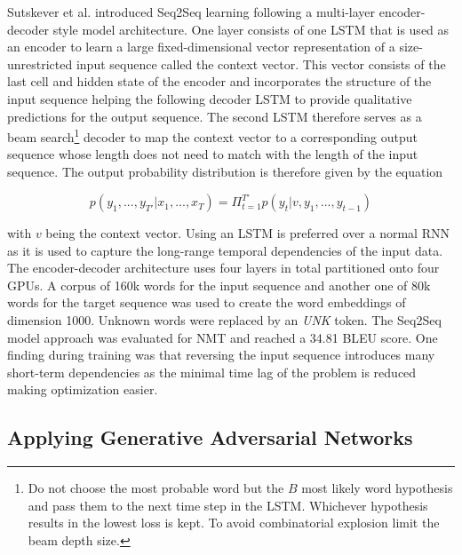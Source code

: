 Sutskever et al. \cite{Sutskever2014} introduced \ac{Seq2Seq} learning following a multi-layer encoder-decoder style model architecture. One layer consists of one \ac{LSTM} that is used as an encoder to learn a large fixed-dimensional vector representation of a size-unrestricted input sequence called the context vector. This vector consists of the last cell and hidden state of the encoder and incorporates the structure of the input sequence helping the following decoder \ac{LSTM} to provide qualitative predictions for the output sequence. The second \ac{LSTM} therefore serves as a beam search\footnote{Do not choose the most probable word but the $B$ most likely word hypothesis and pass them to the next time step in the \ac{LSTM}. Whichever hypothesis results in the lowest loss is kept. To avoid combinatorial explosion limit the beam depth size.} decoder to map the context vector to a corresponding output sequence whose length does not need to match with the length of the input sequence. The output probability distribution is therefore given by the equation

\begin{equation}
	p(y_1, ..., y_{T'} | x_1, ..., x_{T}) = \Pi_{t=1}^{T'} p(y_t | v, y_1, ..., y_{t-1})
\end{equation}

with $v$ being the context vector. Using an \ac{LSTM} is preferred over a normal \ac{RNN} as it is used to capture the long-range temporal dependencies of the input data. The encoder-decoder architecture uses four layers in total partitioned onto four \acp{GPU}. A corpus of 160k words for the input sequence and another one of 80k words for the target sequence was used to create the word embeddings of dimension 1000. Unknown words were replaced by an \textit{UNK} token. The \ac{Seq2Seq} model approach was evaluated for \ac{NMT} and reached a 34.81 \ac{BLEU} score. One finding during training was that reversing the input sequence introduces many short-term dependencies as the minimal time lag of the problem is reduced making optimization easier. \cite{Sutskever2014}

\subsection{Applying Generative Adversarial Networks} \label{fundamentalsG}

